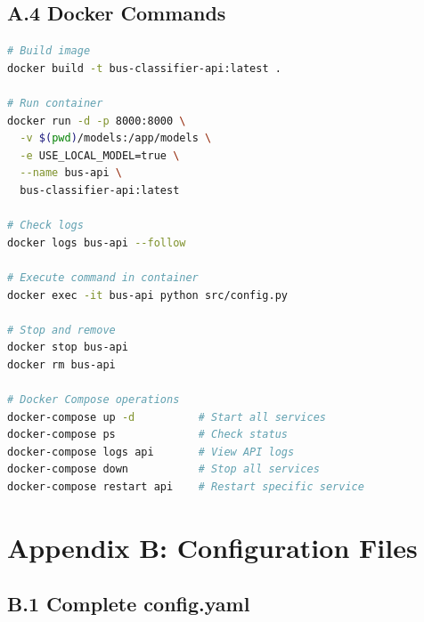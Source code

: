 \subsection*{A.4 Docker Commands}

\begin{lstlisting}[language=bash, caption=Common Docker Operations]
# Build image
docker build -t bus-classifier-api:latest .

# Run container
docker run -d -p 8000:8000 \
  -v $(pwd)/models:/app/models \
  -e USE_LOCAL_MODEL=true \
  --name bus-api \
  bus-classifier-api:latest

# Check logs
docker logs bus-api --follow

# Execute command in container
docker exec -it bus-api python src/config.py

# Stop and remove
docker stop bus-api
docker rm bus-api

# Docker Compose operations
docker-compose up -d          # Start all services
docker-compose ps             # Check status
docker-compose logs api       # View API logs
docker-compose down           # Stop all services
docker-compose restart api    # Restart specific service
\end{lstlisting}

\section*{Appendix B: Configuration Files}

\subsection*{B.1 Complete config.yaml}

